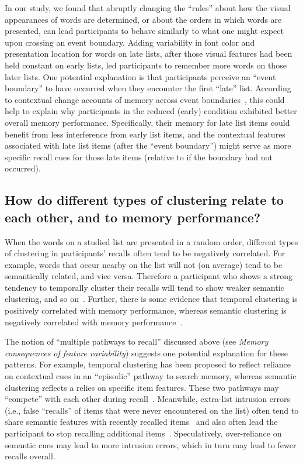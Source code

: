 \documentclass[11pt]{article}
\begin{document}
In our study, we found that abruptly changing the ``rules'' about how the
visual appearances of words are determined, or about the orders in which words
are presented, can lead participants to behave similarly to what one might
expect upon crossing an event boundary. Adding variability in font color and
presentation location for words on late lists, after those visual features had
been held constant on early lists, led participants to remember more words on
those later lists. One potential explanation is that participants perceive an
``event boundary'' to have occurred when they encounter the first ``late''
list. According to contextual change accounts of memory across event
boundaries~\citep[e.g.,][]{SahaKell02, PettEtal16, GoldEtal17, FlorEtal17},
this could help to explain why participants in the reduced (early) condition
exhibited better overall memory performance. Specifically, their memory for
late list items could benefit from less interference from early list items, and
the contextual features associated with late list items (after the ``event
boundary'') might serve as more specific recall cues for those late items
(relative to if the boundary had not occurred).

\subsection*{How do different types of clustering relate to each other, and to memory performance?}

When the words on a studied list are presented in a random order, different types
of clustering in participants' recalls often tend to be negatively correlated.
For example, words that occur nearby on the list will not (on average)
tend to be semantically related, and vice versa. Therefore a participant who
shows a strong tendency to temporally cluster their recalls will tend to show weaker
semantic clustering, and so on~\citep{HealUitv19, HowaKaha02b, SedeEtal10}.  Further,
there is some evidence that temporal clustering is positively correlated with
memory performance, whereas semantic clustering is negatively correlated with
memory performance~\citep{SedeEtal10}.

The notion of ``multiple pathways to recall'' discussed above (see
\textit{Memory consequences of feature variability}) suggests one potential
explanation for these patterns. For example, temporal clustering has been
proposed to reflect reliance on contextual cues in an ``episodic'' pathway to
search memory, whereas semantic clustering reflects a relies on specific item
features. These two pathways may ``compete'' with each other during
recall~\citep{SochEtal09}. Meanwhile, extra-list intrusion errors (i.e., false
``recalls'' of items that were never encountered on the list) often tend to
share semantic features with recently recalled items~\citep{ZaroEtal06} and
also often lead the participant to stop recalling additional
items~\citep{MillEtal12a}. Speculatively, over-reliance on semantic cues may lead to
more intrusion errors, which in turn may lead to fewer recalls overall.
\end{document}
